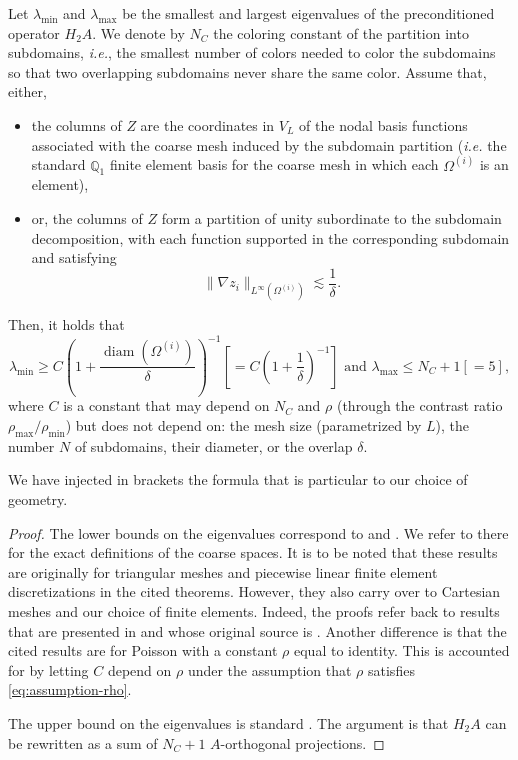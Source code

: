 \documentclass[onefignum,onetabnum]{siamart251216}
\newcommand{\Htwo}{H_2}
\begin{document}
\begin{theorem}
\label{th:DDtheory}
Let $\lambda_{\min}$ and $\lambda_{\max}$ be the smallest and largest eigenvalues of the preconditioned operator $\Htwo A$. We denote by $N_C$ the coloring constant of the partition into subdomains, \textit{i.e.}, the smallest number of colors needed to color
the subdomains so that two overlapping subdomains never share the same color. Assume that, either, 
\begin{itemize}
\item the columns of $Z$ are the coordinates in $V_L$ of the nodal basis functions associated with the coarse mesh induced by the subdomain partition (\textit{i.e.} the standard $\mathbb Q_1$ finite element basis for the coarse mesh in which each $\Omega^{(i)}$ is an element), 
\item or, the columns of $Z$ form a partition of unity subordinate to the subdomain decomposition, with each function supported in the corresponding subdomain and satisfying
\[
\|\nabla z_i\|_{L^\infty(\Omega^{(i)})}
\lesssim
\frac{1}{\delta}.
\]
\end{itemize}
Then, it holds that
\[
\lambda_{\min}\geq C \left(1 + \frac{\operatorname{diam}(\Omega^{(i)})}{\delta} \right)^{-1}  \left[ = C \left(1 + \frac{1}{\delta} \right)^{-1}\right] \text{ and } \lambda_{\max} \leq N_C + 1 \left[ = 5 \right],
\]
where $C$ is a constant that may depend on $N_C$ and $\rho$ (through the contrast ratio $\rho_{\max}/\rho_{\min}$) but does not depend on: the mesh size (parametrized by $L$), the number $N$ of subdomains, their diameter, or the overlap $\delta$.  
\end{theorem}
We have injected in brackets the formula that is particular to our choice of geometry. 
\begin{proof}
The lower bounds on the eigenvalues correspond to \cite[Th. 3.13]{zbMATH02113718} and \cite[Lem. 3.24]{zbMATH02113718}. We refer to there for the exact definitions of the coarse spaces.  It is to be noted that these results are originally for triangular meshes and piecewise linear finite element discretizations in the cited theorems. However, they also carry over to Cartesian meshes and our choice of finite elements. Indeed, the proofs refer back to results that are presented in \cite[Sec. App B1 and App B2]{zbMATH02113718} and whose original source is \cite[Sec. 3.4.1 and Sec 6.3.2]{zbMATH00635667}. Another difference is that the cited results are for Poisson with a constant $\rho$ equal to identity. This is accounted for by letting $C$ depend on $\rho$ under the assumption that $\rho$ satisfies \eqref{eq:assumption-rho}.

The upper bound on the eigenvalues is standard \cite[Lem 3.11]{zbMATH00635667}. The argument is that $\Htwo A$ can be rewritten as a sum of $N_C + 1$ $A$-orthogonal projections. 
\end{proof}
\end{document}
